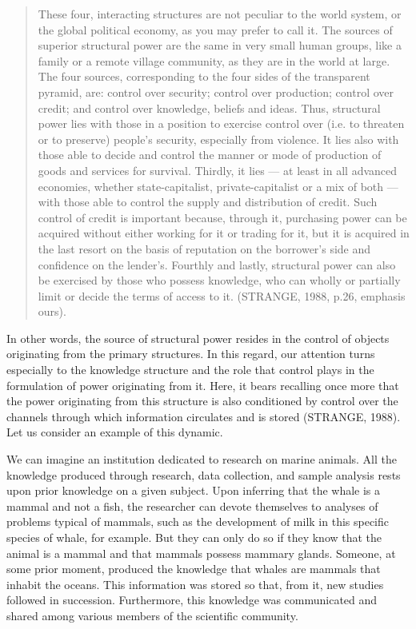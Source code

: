 \begin{quote}
These four, interacting structures are not peculiar to the world system, or the global political economy, as you may prefer to call it. The sources of superior structural power are the same in very small human groups, like a family or a remote village community, as they are in the world at large. The four sources, corresponding to the four sides of the transparent pyramid, are: control over security; control over production; control over credit; and control over knowledge, beliefs and ideas. Thus, structural power lies with those in a position to exercise control over (i.e. to threaten or to preserve) people's security, especially from violence. It lies also with those able to decide and control the manner or mode of production of goods and services for survival. Thirdly, it lies --- at least in all advanced economies, whether state-capitalist, private-capitalist or a mix of both --- with those able to control the supply and distribution of credit. Such control of credit is important because, through it, purchasing power can be acquired without either working for it or trading for it, but it is acquired in the last resort on the basis of reputation on the borrower's side and confidence on the lender's. Fourthly and lastly, structural power can also be exercised by those who possess knowledge, who can wholly or partially limit or decide the terms of access to it. (STRANGE, 1988, p.26, emphasis ours).
\end{quote}

In other words, the source of structural power resides in the control of objects originating from the primary structures. In this regard, our attention turns especially to the knowledge structure and the role that control plays in the formulation of power originating from it. Here, it bears recalling once more that the power originating from this structure is also conditioned by control over the channels through which information circulates and is stored (STRANGE, 1988). Let us consider an example of this dynamic.

We can imagine an institution dedicated to research on marine animals. All the knowledge produced through research, data collection, and sample analysis rests upon prior knowledge on a given subject. Upon inferring that the whale is a mammal and not a fish, the researcher can devote themselves to analyses of problems typical of mammals, such as the development of milk in this specific species of whale, for example. But they can only do so if they know that the animal is a mammal and that mammals possess mammary glands. Someone, at some prior moment, produced the knowledge that whales are mammals that inhabit the oceans. This information was stored so that, from it, new studies followed in succession. Furthermore, this knowledge was communicated and shared among various members of the scientific community.

